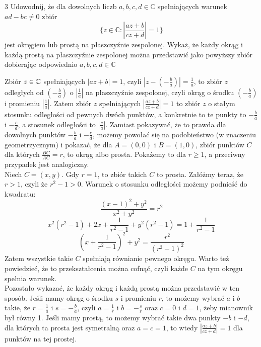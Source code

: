 \documentclass{../note}
\begin{document}
\begin{zadanie}{3}
Udowodnij, że dla dowolnych liczb $a, b, c, d\in\mathbb{C}$ spełniających warunek $ad -bc \ne 0$ zbiór
\[ \{z\in\mathbb{C} : \left|\frac{az+b}{cz+d}\right|=1\} \]
jest okręgiem lub prostą na płaszczyźnie zespolonej. Wykaż, że każdy okrąg i każdą prostą na płaszczyźnie zespolonej można przedstawić jako powyższy zbiór dobierając odpowiednio $a, b, c, d\in\mathbb{C}$
\end{zadanie}
\begin{rozwiazanie}
Zbiór $z \in \mathbb{C}$ spełniających $|az + b| = 1$, czyli $\left|z - \left(-\frac{b}{a}\right)\right| = \frac1a$, to zbiór $z$ odległych od $(-\frac{b}{a})$ o $\left|\frac1a\right|$ na płaszczyźnie zespolonej, czyli okrąg o środku $(-\frac{b}{a})$ i promieniu $\left|\frac1a\right|$. Zatem zbiór $z$ spełniających $\left|\frac{az+b}{cz+d}\right|=1$ to zbiór $z$ o stałym stosunku odległości od pewnych dwóch punktów, a konkretnie to te punkty to $-\frac{b}{a}$ i $-\frac{c}{d}$, a stosunek odległości to $\left|\frac{c}a\right|$. Zamiast pokazywać, że to prawda dla dowolnych punktów $-\frac{b}{a}$ i $-\frac{c}{d}$, możemy powołać się na podobieństwo (w znaczeniu geometrzycznym) i pokazać, że dla $A = (0, 0)$ i $B = (1, 0)$, zbiór punktów $C$ dla których $\frac{BC}{AC} = r$, to okrąg albo prosta. Pokażemy to dla $r \geq 1$, a przeciwny przypadek jest analogiczny.\\
Niech $C = (x, y)$. Gdy $r=1$, to zbiór takich $C$ to prosta. Załóżmy teraz, że $r > 1$, czyli że $r^2 - 1 > 0$. Warunek o stosunku odległości możemy podnieść do kwadratu:
\[\frac{(x-1)^2+y^2}{x^2+y^2} = r^2\]
\[x^2(r^2 - 1) + 2x + \frac{1}{r^2 - 1} + y^2(r^2-1) = 1 + \frac{1}{r^2 - 1}\]
\[\left(x + \frac{1}{r^2 - 1}\right)^2 + y^2 = \frac{r^2}{(r^2 - 1)^2}\]
Zatem wszystkie takie $C$ spełniają równianie pewnego okręgu. Warto też powiedzieć, że to przekształcenia można cofnąć, czyli każde $C$ na tym okręgu spełnia warunek.\\
Pozostało wykazać, że każdy okrąg i każdą prostą można przedstawić w ten sposób. Jeśli mamy okrąg o środku $s$ i promieniu $r$, to możemy wybrać $a$ i $b$ takie, że $r= \frac1a$ i $s = -\frac{b}{a}$, czyli $a = \frac1r$ i $b = -\frac{s}{r}$ oraz $c = 0$ i $d = 1$, żeby mianownik był równy 1. Jeśli mamy prostą, to możemy wybrać takie dwa punkty $-b$ i $-d$, dla których ta prosta jest symetralną oraz $a=c=1$, to wtedy $\left|\frac{az+b}{cz+d}\right|=1$ dla punktów na tej prostej.
\end{rozwiazanie}
\end{document}
